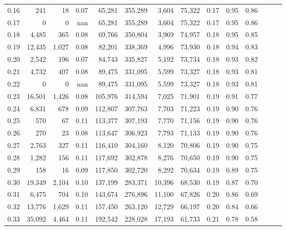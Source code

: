 \begin{tabular}{rrrrrrrrrrrrrr}
0.16 &     241 &     18 &  0.07 &   65,281 &  355,289 &   3,604 &  75,322 &  0.17 &  0.95 &      0.86 \\
0.17 &       0 &      0 &   nan &   65,281 &  355,289 &   3,604 &  75,322 &  0.17 &  0.95 &      0.86 \\
0.18 &   4,485 &    365 &  0.08 &   69,766 &  350,804 &   3,969 &  74,957 &  0.18 &  0.95 &      0.85 \\
0.19 &  12,435 &  1,027 &  0.08 &   82,201 &  338,369 &   4,996 &  73,930 &  0.18 &  0.94 &      0.83 \\
0.20 &   2,542 &    196 &  0.07 &   84,743 &  335,827 &   5,192 &  73,734 &  0.18 &  0.93 &      0.82 \\
0.21 &   4,732 &    407 &  0.08 &   89,475 &  331,095 &   5,599 &  73,327 &  0.18 &  0.93 &      0.81 \\
0.22 &       0 &      0 &   nan &   89,475 &  331,095 &   5,599 &  73,327 &  0.18 &  0.93 &      0.81 \\
0.23 &  16,501 &  1,426 &  0.08 &  105,976 &  314,594 &   7,025 &  71,901 &  0.19 &  0.91 &      0.77 \\
0.24 &   6,831 &    678 &  0.09 &  112,807 &  307,763 &   7,703 &  71,223 &  0.19 &  0.90 &      0.76 \\
0.25 &     570 &     67 &  0.11 &  113,377 &  307,193 &   7,770 &  71,156 &  0.19 &  0.90 &      0.76 \\
0.26 &     270 &     23 &  0.08 &  113,647 &  306,923 &   7,793 &  71,133 &  0.19 &  0.90 &      0.76 \\
0.27 &   2,763 &    327 &  0.11 &  116,410 &  304,160 &   8,120 &  70,806 &  0.19 &  0.90 &      0.75 \\
0.28 &   1,282 &    156 &  0.11 &  117,692 &  302,878 &   8,276 &  70,650 &  0.19 &  0.90 &      0.75 \\
0.29 &     158 &     16 &  0.09 &  117,850 &  302,720 &   8,292 &  70,634 &  0.19 &  0.89 &      0.75 \\
0.30 &  19,349 &  2,104 &  0.10 &  137,199 &  283,371 &  10,396 &  68,530 &  0.19 &  0.87 &      0.70 \\
0.31 &   6,475 &    704 &  0.10 &  143,674 &  276,896 &  11,100 &  67,826 &  0.20 &  0.86 &      0.69 \\
0.32 &  13,776 &  1,629 &  0.11 &  157,450 &  263,120 &  12,729 &  66,197 &  0.20 &  0.84 &      0.66 \\
0.33 &  35,092 &  4,464 &  0.11 &  192,542 &  228,028 &  17,193 &  61,733 &  0.21 &  0.78 &      0.58 \\

\end{tabular}
